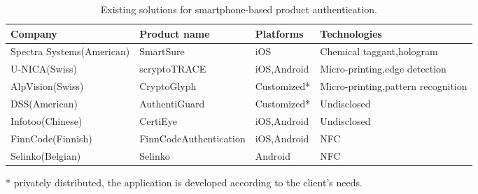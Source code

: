 \documentclass[thesis.tex]{subfiles}
\begin{document}
\begin{table}[h!]
	\caption{Existing solutions for smartphone-based product authentication.} \label{table:existing-solutions}
	\begin{center}
	\begin{tabular}{| m{2.95cm} | m{3.15cm} | m{2.35cm} | m{3.45cm} |}
		\hline
		\textbf{Company}				&	\textbf{Product name}			&	\textbf{Platforms}			&	\textbf{Technologies} \\ \hline
		Spectra Systems\newline (American)		&	SmartSure						&	iOS							&	Chemical taggant,\newline hologram \\ \hline
		U-NICA\newline (Swiss)			&	scryptoTRACE\textregistered		&	iOS,\newline Android				&	Micro-printing,\newline edge detection \\ \hline
		AlpVision\newline (Swiss)		&	CryptoGlyph\textregistered		&	Customized\footnotesize{*}	&	Micro-printing,\newline pattern recognition \\ \hline
		DSS\newline (American)			&	AuthentiGuard					&	Customized\footnotesize{*}	&	Undisclosed \\ \hline
		Infotoo\newline (Chinese)		&	CertiEye						&	iOS,\newline Android				&	Undisclosed \\ \hline
		FinnCode\newline (Finnish)		&	FinnCode\newline Authentication	&	iOS,\newline Android				&	NFC \\ \hline
		Selinko\newline (Belgian)		&	Selinko							&	Android						&	NFC \\
		\hline
	\end{tabular}
	\end{center}
	\vspace{-3mm}
	\scriptsize{*} \small{privately distributed, the application is developed according to the client's needs.}
\end{table}
\end{document}
